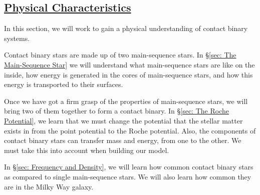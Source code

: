 \documentclass[12pt]{article} %
\numberwithin{equation}{section} %
\begin{document}



\subsection[Physical Characteristics]{\hyperlink{toc}{Physical Characteristics}}


In this section, we will work to gain a physical understanding of contact binary systems.

Contact binary stars are made up of two main-sequence stars. In \S \ref{sec: The Main-Sequence Star} we will understand what main-sequence stars are like on the inside, how energy is generated in the cores of main-sequence stars, and how this energy is transported to their surfaces.

Once we have got a firm grasp of the properties of main-sequence stars, we will bring two of them together to form a contact binary. In \S \ref{sec: The Roche Potential}, we learn that we must change the potential that the stellar matter exists in from the point potential to the Roche potential. Also, the components of contact binary stars can transfer mass and energy, from one to the other. We must take this into account when building our model.

In \S \ref{sec: Frequency and Density}, we will learn how common contact binary stars as compared to single main-sequence stars. We will also learn how common they are in the Milky Way galaxy.
\end{document}
